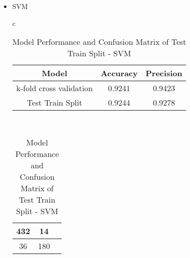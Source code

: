 \documentclass{article}
\begin{document}
\begin{itemize}
\begin{itemize}
\begin{itemize}
\begin{table}[htbp]
\begin{tabular}{c}
                \begin{tabular}{|c|c|c|}
                \hline
                288 & 6 \\
                \hline
                13 & 134 \\
                \hline
                \end{tabular} \\
            \end{tabular}
            \caption{Model Performance and Confusion Matrix of Test Train Split - XGB}
            \label{tab:combined_table}
            \end{table}

        \item SVM
            \begin{table}[htbp]
            \centering
            \begin{tabular}{c} %
                \begin{tabular}{|c|c|c|}
                \hline
                Model & Accuracy & Precision \\
                \hline
                k-fold cross validation & 0.9241 &  0.9423 \\
                \hline
                Test Train Split & 0.9244 & 0.9278 \\
                \hline
                \end{tabular}
                \vspace{5mm} \\ %
                
                \begin{tabular}{|c|c|c|}
                \hline
                432  & 14 \\
                \hline
                36 & 180 \\
                \hline
                \end{tabular} \\
            \end{tabular}
            \caption{Model Performance and Confusion Matrix of Test Train Split - SVM}
            \label{tab:combined_table}
            \end{table}


\end{itemize}
\end{itemize}
\end{itemize}
\end{document}
